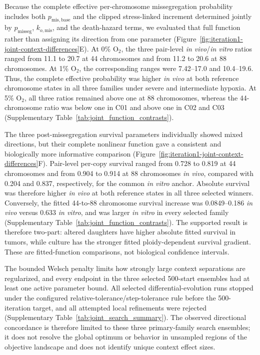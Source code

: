 \documentclass[11pt]{article}
\begin{document}
Because the complete effective per-chromosome missegregation probability includes both \(p_{\mathrm{mis,base}}\) and the clipped stress-linked increment determined jointly by \(p_{\mathrm{misseg}}\), \(k_{o,\mathrm{mis}}\), and the death-hazard terms, we evaluated that full function rather than assigning its direction from one parameter (Figure~\ref{fig:iteration1-joint-context-differences}E). At 0\% O$_2$, the three pair-level \textit{in vivo}/\textit{in vitro} ratios ranged from 11.1 to 20.7 at 44 chromosomes and from 11.2 to 20.6 at 88 chromosomes. At 1\% O$_2$, the corresponding ranges were 7.42--17.0 and 10.4--19.6. Thus, the complete effective probability was higher \textit{in vivo} at both reference chromosome states in all three families under severe and intermediate hypoxia. At 5\% O$_2$, all three ratios remained above one at 88 chromosomes, whereas the 44-chromosome ratio was below one in C01 and above one in C02 and C03 (Supplementary Table~\ref{tab:joint_function_contrasts}).

The three post-missegregation survival parameters individually showed mixed directions, but their complete nonlinear function gave a consistent and biologically more informative comparison (Figure~\ref{fig:iteration1-joint-context-differences}F). Pair-level per-copy survival ranged from 0.728 to 0.819 at 44 chromosomes and from 0.904 to 0.914 at 88 chromosomes \textit{in vivo}, compared with 0.204 and 0.837, respectively, for the common \textit{in vitro} anchor. Absolute survival was therefore higher \textit{in vivo} at both reference states in all three selected winners. Conversely, the fitted 44-to-88 chromosome survival increase was 0.0849--0.186 \textit{in vivo} versus 0.633 \textit{in vitro}, and was larger \textit{in vitro} in every selected family (Supplementary Table~\ref{tab:joint_function_contrasts}). The supported result is therefore two-part: altered daughters have higher absolute fitted survival in tumors, while culture has the stronger fitted ploidy-dependent survival gradient. These are fitted-function comparisons, not biological confidence intervals.

The bounded Welsch penalty limits how strongly large context separations are regularized, and every endpoint in the three selected 500-start ensembles had at least one active parameter bound. All selected differential-evolution runs stopped under the configured relative-tolerance/step-tolerance rule before the 500-iteration target, and all attempted local refinements were rejected (Supplementary Table~\ref{tab:joint_search_summary}). The observed directional concordance is therefore limited to these three primary-family search ensembles; it does not resolve the global optimum or behavior in unsampled regions of the objective landscape and does not identify unique context effect sizes.
\end{document}
